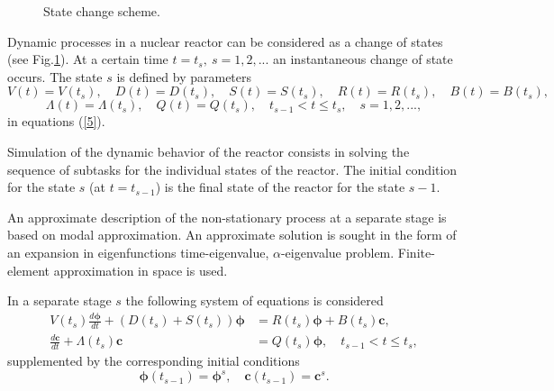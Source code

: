 \documentclass[authoryear]{elsarticle}
\begin{document}
\begin{figure}[ht] 
  \begin{center}
\vspace{5mm} 
    \caption{State change scheme.} 
   \label{fig:1}
  \end{center}
\end{figure}

Dynamic processes in a nuclear reactor can be considered as a change of states  (see  Fig.\ref{fig:1}). 
At a certain time $t = t_s, \ s = 1,2, ...$ an instantaneous change of state occurs. The state
 $s$ is defined by parameters
\[
 V(t) = V(t_s), \quad  D(t) = D(t_s), \quad  S(t) = S(t_s), \quad  R(t) = R(t_s), \quad  B(t) = B(t_s),
\] 
\[
 \Lambda(t) = \Lambda(t_s), \quad  Q(t) = Q(t_s),
 \quad t_{s-1} < t \leq t_s, \quad s = 1,2, ... ,
\] 
in equations  (\ref{5}).

Simulation of the dynamic behavior of the reactor consists in solving the sequence of subtasks for the individual states of the reactor. The initial condition for the state $s$ (at $t = t_{s-1}$) is the final state of the reactor for the state $s-1$.

An approximate description of the non-stationary process at a separate stage is based on modal approximation. An approximate solution is sought in the form of an expansion in eigenfunctions time-eigenvalue, $\alpha$-eigenvalue problem. Finite-element approximation in space is used.

In a separate stage $s$ the following system of equations is considered
\begin{equation}\label{7}
\begin{split}
V(t_s) \frac{d \bm \phi}{d t} + (D(t_s)+S(t_s)) \bm \phi &= R(t_s) \bm \phi + B(t_s)\bm c,
\\
\frac{d \bm c}{d t} + \Lambda(t_s)\bm c &= Q(t_s) \bm \phi, 
\quad t_{s-1} < t \leq t_s,
\end{split}
\end{equation} 
supplemented by the corresponding initial conditions 
\begin{equation}\label{8}
 \bm \phi(t_{s-1}) = \bm \phi^s,
 \quad   \bm c(t_{s-1}) = \bm c^s .
\end{equation} 
\end{document}
